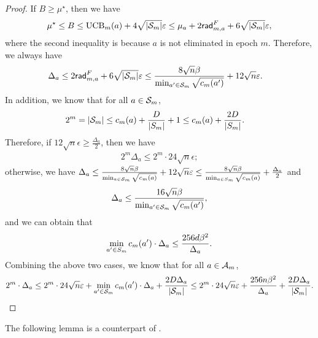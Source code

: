 \begin{proof}
    If $B\geq \mu^\star$, then we have
    \begin{align*}
        \mu^\star\leq B \leq {\operatorname{UCB}}_{m}(a) + 4\sqrt{|{\mathcal{S}}_m|}\varepsilon \leq \mu_a + 2\mathsf{rad}_{m,a}^{F} + 6\sqrt{|{\mathcal{S}}_m|}\varepsilon,
    \end{align*}
    where the second inequality is because $a$ is not eliminated in epoch $m$. Therefore, we always have
    \begin{align*}
        \Delta_a &\leq 2\mathsf{rad}_{m,a}^{F} + 6\sqrt{|{\mathcal{S}}_m|}\varepsilon \leq \frac{8\sqrt{n}\beta}{\min_{a'\in {\mathcal{S}}_m}\sqrt{c_m(a')}} + 12\sqrt{n}\varepsilon.
    \end{align*} 
    In addition, we know that for all $a\in {\mathcal{S}}_m$,
    \begin{align*}
        2^m &= |{\mathcal{S}}_m| \leq c_m(a) + \frac{D}{|S_m|} + 1 \leq c_m(a) + \frac{2D}{|S_m|}.
    \end{align*}
    Therefore, if $12\sqrt{n}\epsilon\geq \frac{\Delta_a}{2}$, then we have
    \begin{align*}
        2^m\Delta_a\leq 2^m\cdot 24\sqrt{n}\epsilon;
    \end{align*}
    otherwise, we have $\Delta_a \leq \frac{8\sqrt{n}\beta}{\min_{a\in {\mathcal{S}}_m}\sqrt{c_m(a)}} + 12\sqrt{n}\varepsilon \leq \frac{8\sqrt{n}\beta}{\min_{a\in S_m}\sqrt{c_m(a)}}  + \frac{\Delta_a}{2}$ and
    \begin{align*}
        \Delta_a \leq \frac{16\sqrt{n}\beta}{\min_{a'\in {\mathcal{S}}_m}\sqrt{c_m(a')}},
    \end{align*}
    and we can obtain that
    \begin{align*}
        \min_{a'\in S_m}{c_m(a')}\cdot \Delta_a\leq \frac{256d\beta^2}{\Delta_a}.
    \end{align*}
    Combining the above two cases, we know that for all $a\in{\mathcal{A}}_m$, $$2^m\cdot \Delta_a\leq 2^m\cdot 24\sqrt{n}\varepsilon+ \min_{a'\in {\mathcal{S}}_m}c_m(a')\cdot \Delta_a + \frac{2D\Delta_a}{|{\mathcal{S}}_m|} \leq  2^m\cdot 24\sqrt{n}\varepsilon+\frac{256n\beta^2}{\Delta_a} + \frac{2D\Delta_a}{|{\mathcal{S}}_m|}.$$
\end{proof}

The following lemma is a counterpart of . 


